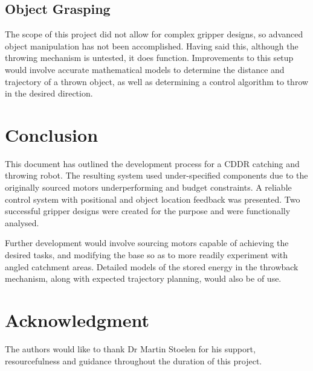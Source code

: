 \documentclass[conference]{IEEEtran}
\begin{document}
\subsection{Object Grasping}
The scope of this project did not allow for complex gripper designs, so advanced object manipulation has not been accomplished. Having said this, although the throwing mechanism is untested, it does function. Improvements to this setup would involve accurate mathematical models to determine the distance and trajectory of a thrown object, as well as determining a control algorithm to throw in the desired direction.

\section{Conclusion}
This document has outlined the development process for a CDDR catching and throwing robot. The resulting system used under-specified components due to the originally sourced motors underperforming and budget constraints. A reliable control system with positional and object location feedback was presented. Two successful gripper designs were created for the purpose and were functionally analysed.

Further development would involve sourcing motors capable of achieving the desired tasks, and modifying the base so as to more readily experiment with angled catchment areas. Detailed models of the stored energy in the throwback mechanism, along with expected trajectory planning, would also be of use.



\section*{Acknowledgment}


The authors would like to thank Dr Martin Stoelen for his support, resourcefulness and guidance throughout the duration of this project.


	
	
	
	
	
	{}
	
	

	
	
\end{document}
